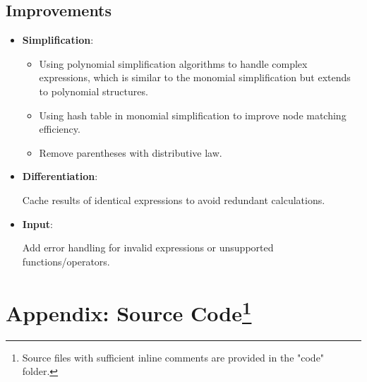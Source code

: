 \documentclass{report}
\begin{document}
\section*{Improvements}
\begin{itemize}
    \item \textbf{Simplification}:
    \begin{itemize}
        \item Using polynomial simplification algorithms to handle complex expressions, which is similar to the monomial simplification but extends to polynomial structures.
        \item Using hash table in monomial simplification to improve node matching efficiency.
        \item Remove parentheses with distributive law.
    \end{itemize}
    \item \textbf{Differentiation}:
    
    Cache results of identical expressions to avoid redundant calculations.
    \item \textbf{Input}:
    
    Add error handling for invalid expressions or unsupported functions/operators.
\end{itemize}


\chapter*{Appendix: Source Code\footnote{Source files with sufficient inline comments are provided in the "code" folder.}}
\end{document}
